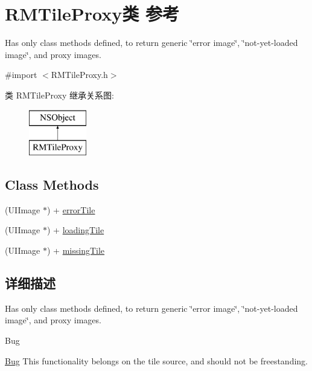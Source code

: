 \hypertarget{interface_r_m_tile_proxy}{\section{R\-M\-Tile\-Proxy类 参考}
\label{interface_r_m_tile_proxy}
}


Has only class methods defined, to return generic \char`\"{}error image\char`\"{}, \char`\"{}not-\/yet-\/loaded image\char`\"{}, and proxy images.  




{\ttfamily \#import $<$R\-M\-Tile\-Proxy.\-h$>$}

类 R\-M\-Tile\-Proxy 继承关系图\-:\begin{figure}[H]
\begin{center}
\leavevmode
\includegraphics[height=2.000000cm]{interface_r_m_tile_proxy}
\end{center}
\end{figure}
\subsection*{Class Methods}
\begin{DoxyCompactItemize}
\item 
(U\-I\-Image $\ast$) + \hyperlink{interface_r_m_tile_proxy_a7fda347b019c016d8f61e47bb844a2c1}{error\-Tile}
\item 
(U\-I\-Image $\ast$) + \hyperlink{interface_r_m_tile_proxy_af56965487789b6964c3acaa9562c2c3f}{loading\-Tile}
\item 
(U\-I\-Image $\ast$) + \hyperlink{interface_r_m_tile_proxy_a9d7165736ea9f9445917733467056983}{missing\-Tile}
\end{DoxyCompactItemize}


\subsection{详细描述}
Has only class methods defined, to return generic \char`\"{}error image\char`\"{}, \char`\"{}not-\/yet-\/loaded image\char`\"{}, and proxy images. 

\begin{DoxyRefDesc}{Bug}
\item[\hyperlink{bug__bug000051}{Bug}]This functionality belongs on the tile source, and should not be freestanding. \end{DoxyRefDesc}


